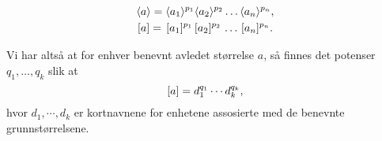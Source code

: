 \documentclass[a4paper,11pt]{article}
\begin{document}
\newpageNotLF



\begin{align}
  \langle&a\rangle
  = \langle a_1\rangle^{p_1}\langle a_2\rangle^{p_2}\dots\langle a_n\rangle^{p_n},
  \label{Mregel}\\
  [&a]
  = \,[a_1]^{p_1}\,[a_2]^{p_2}\,\dots\,[a_n]^{p_n}
  \label{Bregel}.
\end{align}

Vi har altså at for enhver benevnt avledet
størrelse $a$, så finnes det potenser $q_1,\dots,q_k$ slik at
%
\begin{equation}
  [a] = d_1^{q_1}\cdots d_k^{q_k},\label{BasicUnitExpansion}
\end{equation}
%
hvor $d_1,\cdots,d_k$ er kortnavnene for enhetene assosierte med de benevnte
grunnstørrelsene.

\end{document}
